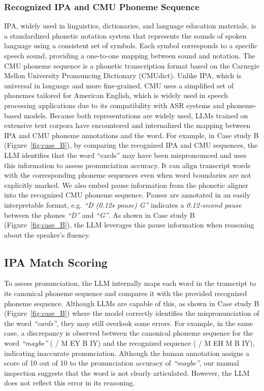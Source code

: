 \documentclass[11pt]{article}
\begin{document}
\subsubsection{Recognized IPA and CMU Phoneme Sequence}
IPA, widely used in linguistics, dictionaries, and language education materials, is a standardized phonetic notation system that represents the sounds of spoken language using a consistent set of symbols. Each symbol corresponds to a specific speech sound, providing a one-to-one mapping between sound and notation. The CMU phoneme sequence is a phonetic transcription format based on the Carnegie Mellon University Pronouncing Dictionary (CMUdict). Unlike IPA, which is universal in language and more fine-grained, CMU uses a simplified set of phonemes tailored for American English, which is widely used in speech processing applications due to its compatibility with ASR systems and phoneme-based models. Because both representations are widely used, LLMs trained on extensive text corpora have encountered and internalized the mapping between IPA and CMU phoneme annotations and the word. For example, in Case study B (Figure~\ref{fig:case_B}), by comparing the recognized IPA and CMU sequences, the LLM identifies that the word “cards” may have been mispronounced and uses this information to assess pronunciation accuracy. It can align transcript words with the corresponding phoneme sequences even when word boundaries are not explicitly marked. We also embed pause information from the phonetic aligner into the recognized CMU phoneme sequence. Pauses are annotated in an easily interpretable format, e.g. \textit{“D (0.12s pause) G”} indicates a \textit{0.12-second pause} between the phones \textit{“D”} and \textit{“G”}. As shown in Case study B (Figure~\ref{fig:case_B}), the LLM leverages this pause information when reasoning about the speaker’s fluency.


\subsection{IPA Match Scoring}
To assess pronunciation, the LLM internally maps each word in the transcript to its canonical phoneme sequence and compares it with the provided recognized phoneme sequence. Although LLMs are capable of this, as shown in Case study B (Figure~\ref{fig:case_B}) where the model correctly identifies the mispronunciation of the word \textit{“cards”}, they may still overlook some errors. For example, in the same case, a discrepancy is observed between the canonical phoneme sequence for the word \textit{“maybe”} ( / M EY B IY) and the recognized sequence ( / M EH M B IY), indicating inaccurate pronunciation. Although the human annotation assigns a score of 10 out of 10 to the pronunciation accuracy of \textit{“maybe”}, our manual inspection suggests that the word is not clearly articulated. However, the LLM does not reflect this error in its reasoning.
\end{document}
